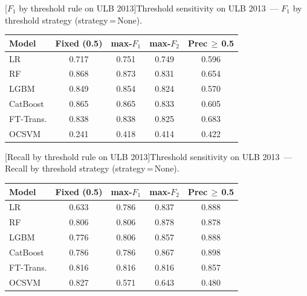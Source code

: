 \noindent\begin{minipage}{\linewidth}\centering
{}[$F_1$ by threshold rule on ULB 2013]{Threshold sensitivity on ULB 2013~--- $F_1$ by threshold strategy (strategy\,=\,None).}
\label{tab:threshold_ulb_f1}
\begin{tabular}{l c c c c}
\toprule
Model & Fixed (0.5) & max-$F_1$ & max-$F_2$ & Prec\,$\geq$\,0.5 \\
\midrule
LR         & 0.717 & 0.751 & 0.749 & 0.596 \\
RF         & 0.868 & 0.873 & 0.831 & 0.654 \\
LGBM       & 0.849 & 0.854 & 0.824 & 0.570 \\
CatBoost   & 0.865 & 0.865 & 0.833 & 0.605 \\
FT-Trans.  & 0.838 & 0.838 & 0.825 & 0.683 \\
OCSVM      & 0.241 & 0.418 & 0.414 & 0.422 \\
\bottomrule
\end{tabular}
\end{minipage}

\noindent\begin{minipage}{\linewidth}\centering
{}[Recall by threshold rule on ULB 2013]{Threshold sensitivity on ULB 2013~--- Recall by threshold strategy (strategy\,=\,None).}
\label{tab:threshold_ulb_recall}
\begin{tabular}{l c c c c}
\toprule
Model & Fixed (0.5) & max-$F_1$ & max-$F_2$ & Prec\,$\geq$\,0.5 \\
\midrule
LR         & 0.633 & 0.786 & 0.837 & 0.888 \\
RF         & 0.806 & 0.806 & 0.878 & 0.878 \\
LGBM       & 0.776 & 0.806 & 0.857 & 0.888 \\
CatBoost   & 0.786 & 0.786 & 0.867 & 0.898 \\
FT-Trans.  & 0.816 & 0.816 & 0.816 & 0.857 \\
OCSVM      & 0.827 & 0.571 & 0.643 & 0.480 \\
\bottomrule
\end{tabular}
\end{minipage}


